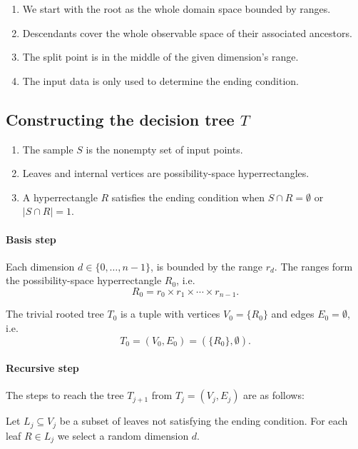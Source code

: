\begin{enumerate}
    \item We start with the root as the whole domain space bounded by ranges.
    \item Descendants cover the whole observable space of their associated ancestors. 
    \item The split point is in the middle of the given dimension’s range.
    \item The input data is only used to determine the ending condition.
\end{enumerate}

\subsection{Constructing the decision tree $T$}

\begin{enumerate}
    \item The sample \(S\) is the nonempty set of input points.
    \item Leaves and internal vertices are possibility-space hyperrectangles. 
    \item A hyperrectangle $R$ satisfies the ending condition when \(S \cap R = \emptyset\) or \(| S \cap R | = 1\).
\end{enumerate}



\paragraph{Basis step}
Each dimension \(d \in\{0, \dots, n-1\}\), is bounded by the range \(r_d\). The ranges form the possibility-space hyperrectangle \(R_0\), i.e.
\[R_0 =  r_0 \times r_1 \times \cdots \times r_{n-1}.\]

The trivial rooted tree \(T_0\) is a tuple with
vertices \(V_0 = \{R_0\}\) and edges \(E_0 = \emptyset\), i.e.
\[T_0= (V_0, E_0) = (\{R_0\},\emptyset).\]

\paragraph{Recursive step}
The steps to reach the tree \(T_{j+1}\) from \(T_{j} = (V_j, E_j)\) are
as follows:

Let \(L_j \subseteq V_j\) be a subset of leaves not satisfying the
ending condition.
For each leaf \(R \in L_j\) we
select a random dimension \(d\).

